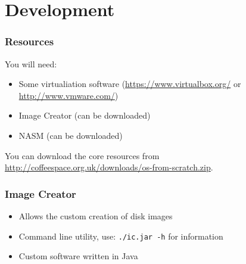 \documentclass[10pt]{beamer}
\begin{document}
  \section[Dev]{Development}
  \begin{frame}
    \frametitle{Resources}
    You will need:
    \begin{itemize}
      \item Some virtualiation software (\url{https://www.virtualbox.org/} or
        \url{http://www.vmware.com/})
      \item Image Creator (can be downloaded)
      \item NASM (can be downloaded)
    \end{itemize}
    You can download the core resources from
    \url{http://coffeespace.org.uk/downloads/os-from-scratch.zip}.
  \end{frame}
  \begin{frame}
    \frametitle{Image Creator}
    \begin{itemize}
      \item Allows the custom creation of disk images
      \item Command line utility, use: \texttt{./ic.jar -h} for information
      \item Custom software written in Java
    \end{itemize}
  \end{frame}
\end{document}

